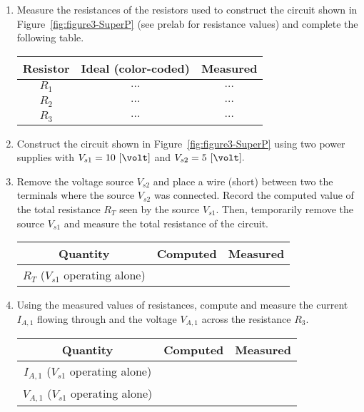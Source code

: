 \begin{enumerate}

\item Measure the resistances of the resistors used to construct the circuit shown in Figure~\ref{fig:figure3-SuperP} (see prelab for resistance values) and complete the following table.

  \begin{center}
    \begin{tabular}{c|c|c}
      \toprule
      Resistor &  Ideal (color-coded) & Measured\\
      \toprule
      $R_1$ & $\ldots$ & $\ldots$\\   %
      $R_2$ & $\ldots$ & $\ldots$\\   %
      $R_3$ & $\ldots$ & $\ldots$\\   %
      \bottomrule
    \end{tabular}    
  \end{center}


  \item Construct the circuit shown in Figure~\ref{fig:figure3-SuperP} using two power supplies with $V_{s1} = 10~[\volt]$ and $V_{s2}=5~[\volt].$


\item Remove the voltage source $V_{s2}$ and place a wire (short) between two the terminals where the source $V_{s2}$ was connected.  Record the computed value of the total resistance $R_T$ seen by the source $V_{s1}.$ Then, temporarily remove the source $V_{s1}$ and measure the total resistance of the circuit. 

  \begin{center}
    \begin{tabular}{|c|c|c|}
      \toprule
      Quantity & Computed & Measured\\
      \toprule
      $R_T$ ($V_{s1}$ operating alone) & & \\
      \bottomrule
    \end{tabular}      
  \end{center}


\item Using the measured values of resistances, compute and measure the current $I_{A,1}$ flowing through and the voltage $V_{A,1}$ across the resistance $R_3.$


  \begin{center}
   \begin{tabular}{|c|c|c|}
    \toprule
    Quantity & Computed & Measured\\
    \toprule
     $I_{A,1}$ ($V_{s1}$ operating alone) & & \\
     \hline
    $V_{A,1}$ ($V_{s1}$ operating alone) & & \\     
    \bottomrule
   \end{tabular}
%       
  \end{center}



\end{enumerate}
